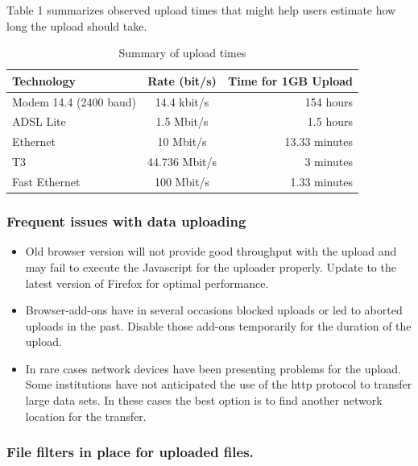 \documentclass[12pt,fullpage]{report}
\begin{document}
Table 1 summarizes observed upload times that might help users estimate how long the upload should take.

\begin{table}
\begin{center}
\caption{Summary of upload times}
\begin{tabular}{ l | c | r }
Technology & Rate (bit/s) & Time for 1GB Upload\\
  \hline
Modem 14.4 (2400 baud) &	14.4 kbit/s&	154 hours\\
ADSL Lite & 1.5 Mbit/s &	1.5 hours\\
Ethernet&	10 Mbit/s & 13.33 minutes\\
T3 &	44.736 Mbit/s &~3 minutes\\
Fast Ethernet &	100 Mbit/s &1.33 minutes\\
  \hline
\end{tabular}
\end{center}
\end{table}

\subsubsection{Frequent issues with data uploading}

\begin{itemize}
\item Old browser version will not provide good throughput with the upload and may fail to execute the Javascript for the uploader properly. Update to the latest version of Firefox for optimal performance.
\item Browser-add-ons have in several occasions blocked uploads or led to aborted uploads in the past. Disable those add-ons temporarily for the duration of the upload.
\item In rare cases network devices have been presenting problems for the upload. Some institutions have not anticipated the use of the http protocol to transfer large data sets. In these cases the best option is to find another network location for the transfer.
\end{itemize}


\subsubsection{File filters in place for uploaded files.}
\end{document}
